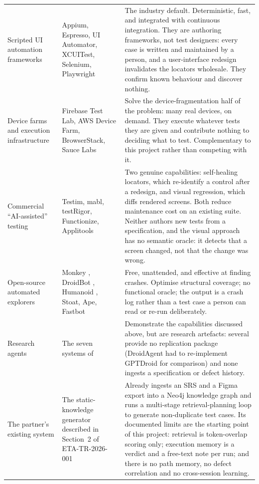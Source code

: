 \begin{xltabular}{\textwidth}{@{}>{\hsize}Y>{\hsize}Y>{\hsize}Y@{}}
  Scripted UI automation frameworks & Appium, Espresso, UI Automator, XCUITest, Selenium, Playwright &
    The industry default. Deterministic, fast, and integrated with continuous integration. They are authoring frameworks, not test designers: every case is written and maintained by a person, and a user-interface redesign invalidates the locators wholesale. They confirm known behaviour and discover nothing. \\
  \addlinespace
  Device farms and execution infrastructure & Firebase Test Lab, AWS Device Farm, BrowserStack, Sauce Labs &
    Solve the device-fragmentation half of the problem: many real devices, on demand. They execute whatever tests they are given and contribute nothing to deciding what to test. Complementary to this project rather than competing with it. \\
  \addlinespace
  Commercial ``AI-assisted'' testing & Testim, mabl, testRigor, Functionize, Applitools &
    Two genuine capabilities: self-healing locators, which re-identify a control after a redesign, and visual regression, which diffs rendered screens. Both reduce maintenance cost on an existing suite. Neither authors new tests from a specification, and the visual approach has no semantic oracle: it detects that a screen changed, not that the change was wrong. \\
  \addlinespace
  Open-source automated explorers & Monkey \cite{monkey}, DroidBot \cite{droidbot}, Humanoid \cite{humanoid}, Stoat, Ape, Fastbot &
    Free, unattended, and effective at finding crashes. Optimise structural coverage; no functional oracle; the output is a crash log rather than a test case a person can read or re-run deliberately. \\
  \addlinespace
  Research agents & The seven systems of  &
    Demonstrate the capabilities discussed above, but are research artefacts: several provide no replication package (DroidAgent had to re-implement GPTDroid for comparison) and none ingests a specification or defect history. \\
  \addlinespace
  The partner's existing system & The static-knowledge generator described in Section~2 of ETA-TR-2026-001 \cite{etatr} &
    Already ingests an SRS and a Figma export into a Neo4j knowledge graph and runs a multi-stage retrieval-planning loop to generate non-duplicate test cases. Its documented limits are the starting point of this project: retrieval is token-overlap scoring only; execution memory is a verdict and a free-text note per run; and there is no path memory, no defect correlation and no cross-session learning. \\
\end{xltabular}
\endgroup

